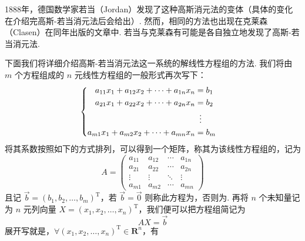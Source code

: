 1888年，德国数学家若当（Jordan）发现了这种高斯消元法的变体（具体的变化在介绍完高斯-若当消元法后会给出）. 然而，相同的方法也出现在克莱森（Clasen）在同年出版的文章中. 若当与克莱森有可能是各自独立地发现了高斯-若当消元法.

下面我们将详细介绍高斯-若当消元法这一系统的解线性方程组的方法. 我们将由 $m$ 个方程组成的 $n$ 元线性方程组的一般形式再次写下：
\[ \begin{cases} \begin{aligned}
            a_{11}x_1+a_{12}x_2+\cdots+a_{1n}x_n & = b_1           \\
            a_{21}x_1+a_{22}x_2+\cdots+a_{2n}x_n & = b_2           \\
                                                 & \vdotswithin{=} \\
            a_{m1}x_1+a_{m2}x_2+\cdots+a_{mn}x_n & = b_m
        \end{aligned} \end{cases} \]
将其系数按照如下的方式排列，可以得到一个矩阵，称其为该线性方程组的，记为
\[A = \begin{pmatrix}
        a_{11} & a_{12} & \cdots & a_{1n} \\
        a_{21} & a_{22} & \cdots & a_{2n} \\
        \vdots & \vdots & \ddots & \vdots \\
        a_{m1} & a_{m2} & \cdots & a_{mn}
    \end{pmatrix}\]
且记 $\vec{b} = (b_1,b_2,\ldots,b_m)^\mathrm{T}$，若 $\vec{b} = \vec{0}$ 则称此方程为，否则为. 再将 $n$ 个未知量记为 $n$ 元列向量 $X = (x_1,x_2,\ldots,x_n)^\mathrm{T}$，我们便可以把方程组简记为
\begin{equation} \label{eq:线性方程组的矩阵表示}
    AX = \vec{b}
\end{equation}
展开写就是，$\forall (x_1,x_2,\ldots,x_n)^\mathrm{T} \in \mathbf{R}^n$，有
